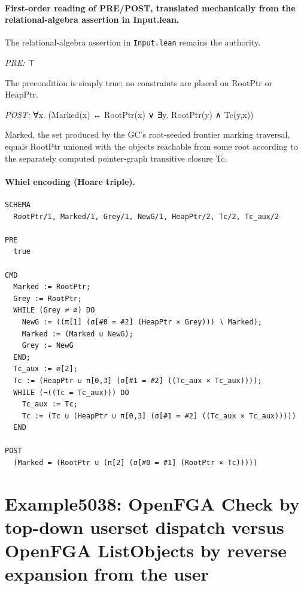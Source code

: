 \documentclass[10pt]{article}
\begin{document}
\paragraph{First-order reading of PRE/POST, translated mechanically from the relational-algebra assertion in Input.lean.} The relational-algebra assertion in \texttt{Input.lean} remains the authority.

\textit{PRE:} ⊤\par The precondition is simply true; no constraints are placed on RootPtr or HeapPtr.

\textit{POST:} ∀x. (Marked(x) ↔ RootPtr(x) ∨ ∃y. RootPtr(y) ∧ Tc(y,x))\par Marked, the set produced by the GC's root-seeded frontier marking traversal, equals RootPtr unioned with the objects reachable from some root according to the separately computed pointer-graph transitive closure Tc.

\paragraph{Whiel encoding (Hoare triple).}

\begin{Verbatim}[fontsize=\scriptsize,breaklines=true,breakanywhere=true,frame=single,framesep=1.5mm]
SCHEMA
  RootPtr/1, Marked/1, Grey/1, NewG/1, HeapPtr/2, Tc/2, Tc_aux/2

PRE
  true

CMD
  Marked := RootPtr;
  Grey := RootPtr;
  WHILE (Grey ≠ ∅) DO
    NewG := ((π[1] (σ[#0 = #2] (HeapPtr × Grey))) ∖ Marked);
    Marked := (Marked ∪ NewG);
    Grey := NewG
  END;
  Tc_aux := ∅[2];
  Tc := (HeapPtr ∪ π[0,3] (σ[#1 = #2] ((Tc_aux × Tc_aux))));
  WHILE (¬((Tc = Tc_aux))) DO
    Tc_aux := Tc;
    Tc := (Tc ∪ (HeapPtr ∪ π[0,3] (σ[#1 = #2] ((Tc_aux × Tc_aux)))))
  END

POST
  (Marked = (RootPtr ∪ (π[2] (σ[#0 = #1] (RootPtr × Tc)))))
\end{Verbatim}

\Needspace{0.45\textheight}

\section{Example5038: OpenFGA Check by top-down userset dispatch versus OpenFGA ListObjects by reverse expansion from the user}\label{case:Example5038}
\end{document}

